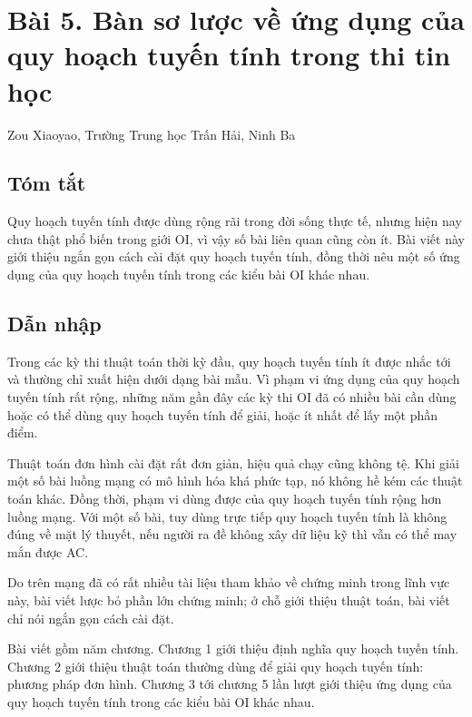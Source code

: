 \documentclass[11pt]{article}
\begin{document}
\section*{Bài 5. Bàn sơ lược về ứng dụng của quy hoạch tuyến tính trong thi tin học}

\begin{center}
Zou Xiaoyao, Trường Trung học Trấn Hải, Ninh Ba
\end{center}

\subsection*{Tóm tắt}

Quy hoạch tuyến tính được dùng rộng rãi trong đời sống thực tế, nhưng hiện nay
chưa thật phổ biến trong giới OI, vì vậy số bài liên quan cũng còn ít. Bài
viết này giới thiệu ngắn gọn cách cài đặt quy hoạch tuyến tính, đồng thời nêu
một số ứng dụng của quy hoạch tuyến tính trong các kiểu bài OI khác nhau.

\subsection*{Dẫn nhập}

Trong các kỳ thi thuật toán thời kỳ đầu, quy hoạch tuyến tính ít được nhắc tới
và thường chỉ xuất hiện dưới dạng bài mẫu. Vì phạm vi ứng dụng của quy hoạch
tuyến tính rất rộng, những năm gần đây các kỳ thi OI đã có nhiều bài cần dùng
hoặc có thể dùng quy hoạch tuyến tính để giải, hoặc ít nhất để lấy một phần
điểm.

Thuật toán đơn hình cài đặt rất đơn giản, hiệu quả chạy cũng không tệ. Khi
giải một số bài luồng mạng có mô hình hóa khá phức tạp, nó không hề kém các
thuật toán khác. Đồng thời, phạm vi dùng được của quy hoạch tuyến tính rộng
hơn luồng mạng. Với một số bài, tuy dùng trực tiếp quy hoạch tuyến tính là
không đúng về mặt lý thuyết, nếu người ra đề không xây dữ liệu kỹ thì vẫn có
thể may mắn được AC.

Do trên mạng đã có rất nhiều tài liệu tham khảo về chứng minh trong lĩnh vực
này, bài viết lược bỏ phần lớn chứng minh; ở chỗ giới thiệu thuật toán, bài
viết chỉ nói ngắn gọn cách cài đặt.

Bài viết gồm năm chương. Chương 1 giới thiệu định nghĩa quy hoạch tuyến tính.
Chương 2 giới thiệu thuật toán thường dùng để giải quy hoạch tuyến tính:
phương pháp đơn hình. Chương 3 tới chương 5 lần lượt giới thiệu ứng dụng của
quy hoạch tuyến tính trong các kiểu bài OI khác nhau.
\end{document}
